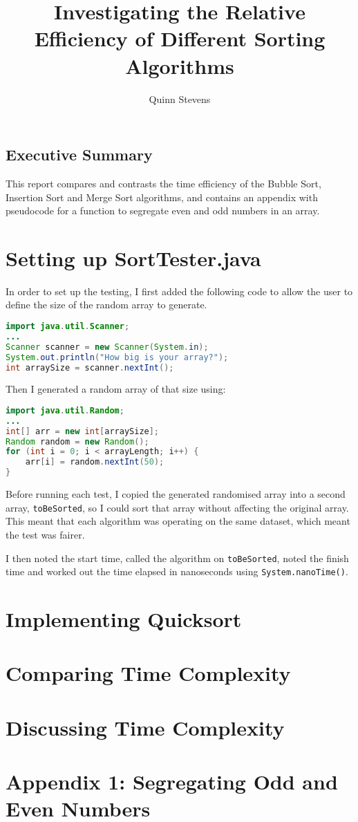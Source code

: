\documentclass{report}
\author{Quinn Stevens}
\title{Investigating the Relative Efficiency of Different Sorting Algorithms}
\begin{document}
\maketitle

\section*{Executive Summary}
This report compares and contrasts the time efficiency of the Bubble Sort, Insertion Sort and Merge Sort algorithms, and contains an appendix with pseudocode for a function to segregate even and odd numbers in an array.

\tableofcontents

\chapter{Setting up Sort\textunderscore Tester.java}
In order to set up the testing, I first added the following code to allow the user to define the size of the random array to generate.

\begin{lstlisting}[language=java, caption=Accepting user input]
import java.util.Scanner;
...
Scanner scanner = new Scanner(System.in);
System.out.println("How big is your array?");
int arraySize = scanner.nextInt();
\end{lstlisting}

Then I generated a random array of that size using:

\begin{lstlisting}[language=java, caption=Generating the randomised array]
import java.util.Random;
...
int[] arr = new int[arraySize];
Random random = new Random();
for (int i = 0; i < arrayLength; i++) {
    arr[i] = random.nextInt(50);
}
\end{lstlisting}

Before running each test, I copied the generated randomised array into a second array, \texttt{toBeSorted}, so I could sort that array without affecting the original array. This meant that each algorithm was operating on the same dataset, which meant the test was fairer.

I then noted the start time, called the algorithm on \texttt{toBeSorted}, noted the finish time and worked out the time elapsed in nanoseconds using \texttt{System.nanoTime()}.



\chapter{Implementing Quicksort}

\chapter{Comparing Time Complexity}

\chapter{Discussing Time Complexity}

\chapter*{Appendix 1: Segregating Odd and Even Numbers}
\end{document}
